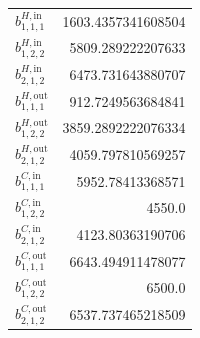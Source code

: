 \documentclass{article}%
\begin{document}
\begin{multicols*}{3}
\begin{supertabular}{lr}
	$b_{1,1,1}^{H,\text{in}}$ & 1603.4357341608504 \\%
	$b_{1,2,2}^{H,\text{in}}$ & 5809.289222207633 \\%
	$b_{2,1,2}^{H,\text{in}}$ & 6473.731643880707 \\%
	$b_{1,1,1}^{H,\text{out}}$ & 912.7249563684841 \\%
	$b_{1,2,2}^{H,\text{out}}$ & 3859.2892222076334 \\%
	$b_{2,1,2}^{H,\text{out}}$ & 4059.797810569257 \\%
	$b_{1,1,1}^{C,\text{in}}$ & 5952.78413368571 \\%
	$b_{1,2,2}^{C,\text{in}}$ & 4550.0 \\%
	$b_{2,1,2}^{C,\text{in}}$ & 4123.80363190706 \\%
	$b_{1,1,1}^{C,\text{out}}$ & 6643.494911478077 \\%
	$b_{1,2,2}^{C,\text{out}}$ & 6500.0 \\%
	$b_{2,1,2}^{C,\text{out}}$ & 6537.737465218509 \\%
\end{supertabular}%
\end{multicols*}%
\clearpage%
\end{document}
